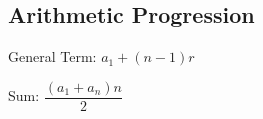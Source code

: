 \subsection{Arithmetic Progression}

General Term: $ a_{1} + (n - 1) r $

Sum: $ \dfrac{(a_{1} + a_{n}) n}{2} $
